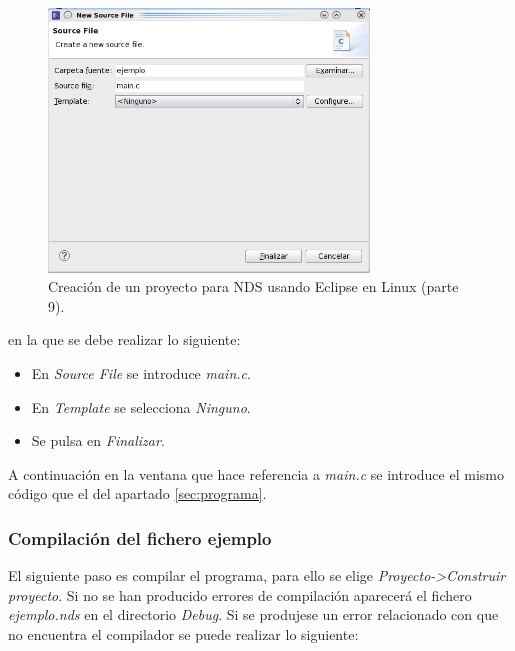\begin{figure}[t]
	\centering
	\includegraphics[height=7cm]{./Figuras/C2/c2_instan9.png}
	\caption{Creación de un proyecto para NDS usando Eclipse en Linux (parte 9).}
	\label{fig_pig_p3_c1_eclipel9}
\end{figure}


\noindent en la que se debe realizar lo siguiente:
\begin{itemize}
 	\item En \textit{Source File} se introduce \textit{main.c}.
 	\item En \textit{Template} se selecciona \textit{Ninguno}.
 	\item Se pulsa en \textit{Finalizar}.
\end{itemize}

A continuación en la ventana que hace referencia a \textit{main.c} se introduce el mismo código que el del apartado \ref{sec:programa}.

\subsubsection{Compilación del fichero ejemplo}
El siguiente paso es compilar el programa, para ello se elige \textit{Proyecto->Construir proyecto}. Si no se han producido errores de compilación aparecerá el fichero \textit{ejemplo.nds} en el directorio \textit{Debug}. Si se produjese un error relacionado con que no encuentra el compilador se puede realizar lo siguiente:

